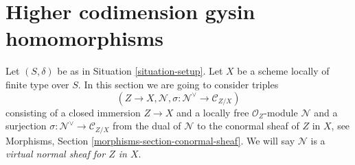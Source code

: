 \section{Higher codimension gysin homomorphisms}
\label{section-gysin-higher-codimension}

\noindent
Let $(S, \delta)$ be as in Situation \ref{situation-setup}. Let $X$ be a scheme
locally of finite type over $S$. In this section we are going to consider
triples
$$
(Z \to X, \mathcal{N}, \sigma : \mathcal{N}^\vee \to \mathcal{C}_{Z/X})
$$
consisting of a closed immersion $Z \to X$ and a locally free
$\mathcal{O}_Z$-module $\mathcal{N}$ and a surjection
$\sigma : \mathcal{N}^\vee \to \mathcal{C}_{Z/X}$ from the dual
of $\mathcal{N}$ to the conormal sheaf of $Z$ in $X$, see
Morphisms, Section \ref{morphisms-section-conormal-sheaf}.
We will say
$\mathcal{N}$ is a {\it virtual normal sheaf for $Z$ in $X$}.

